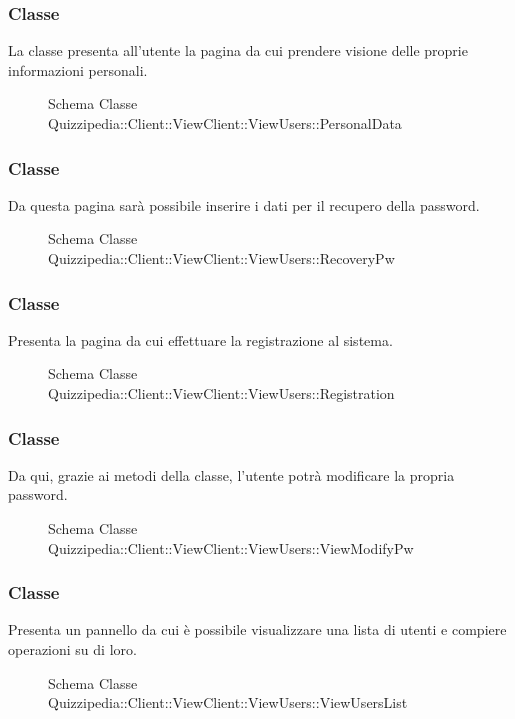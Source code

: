 \subsubsection{Classe }
La classe presenta all'utente la pagina da cui prendere visione delle proprie informazioni personali.
\begin{figure}[H]
\centering
\noindent{}
\caption[Schema Classe PersonalData]{Schema Classe Quizzipedia::Client::ViewClient::ViewUsers::PersonalData}
\end{figure}
\subsubsection{Classe }
Da questa pagina sarà possibile inserire i dati per il recupero della password.
\begin{figure}[H]
\centering
\noindent{}
\caption[Schema Classe RecoveryPw]{Schema Classe Quizzipedia::Client::ViewClient::ViewUsers::RecoveryPw}
\end{figure}
\subsubsection{Classe }
Presenta la pagina da cui effettuare la  registrazione al sistema.
\begin{figure}[H]
\centering
\noindent{}
\caption[Schema Classe Registration]{Schema Classe Quizzipedia::Client::ViewClient::ViewUsers::Registration}
\end{figure}
\subsubsection{Classe }
Da qui, grazie ai metodi della classe, l'utente potrà modificare la propria password.
\begin{figure}[H]
\centering
\noindent{}
\caption[Schema Classe ViewModifyPw]{Schema Classe Quizzipedia::Client::ViewClient::ViewUsers::ViewModifyPw}
\end{figure}
\subsubsection{Classe }
Presenta un pannello da cui è possibile visualizzare una lista di utenti e compiere operazioni su di loro.
\begin{figure}[H]
\centering
\noindent{}
\caption[Schema Classe ViewUsersList]{Schema Classe Quizzipedia::Client::ViewClient::ViewUsers::ViewUsersList}
\end{figure}
